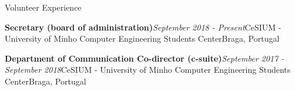 \documentclass{resume}
\begin{document}

\begin{rSection}{Volunteer Experience}

\begin{rSubsection}
{\textbf{Secretary (board of administration)}}{\em September 2018 - Present}{CeSIUM - University of Minho Computer Engineering Students Center}{Braga, Portugal}
\end{rSubsection}

\begin{rSubsection}
{\textbf{Department of Communication Co-director (c-suite)}}{\em September 2017 - September 2018}{CeSIUM - University of Minho Computer Engineering Students Center}{Braga, Portugal}
\end{rSubsection}

\end{rSection}
\end{document}

